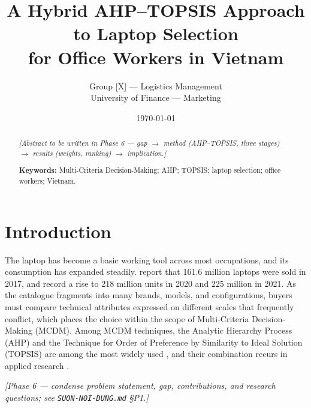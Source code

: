\documentclass[11pt,a4paper]{article}
\title{A Hybrid AHP--TOPSIS Approach to Laptop Selection\\for Office Workers in Vietnam}
\author{Group [X] --- Logistics Management\\University of Finance --- Marketing}
\date{\today}
\begin{document}
\maketitle

\begin{abstract}
\noindent\textit{[Abstract to be written in Phase 6 --- gap $\rightarrow$ method (AHP--TOPSIS, three stages) $\rightarrow$ results (weights, ranking) $\rightarrow$ implication.]}

\vspace{0.5em}
\noindent\textbf{Keywords:} Multi-Criteria Decision-Making; AHP; TOPSIS; laptop selection; office workers; Vietnam.
\end{abstract}

\section{Introduction}\label{sec:p-intro}

The laptop has become a basic working tool across most occupations, and its consumption has
expanded steadily. \textcite{sonmez_cakir_determination_2020} report that 161.6 million laptops
were sold in 2017, and \textcite{gaur_application_2023} record a rise to 218 million units in
2020 and 225 million in 2021. As the catalogue fragments into many brands, models, and
configurations, buyers must compare technical attributes expressed on different scales that
frequently conflict, which places the choice within the scope of Multi-Criteria Decision-Making
(MCDM). Among MCDM techniques, the Analytic Hierarchy Process (AHP) and the Technique for Order
of Preference by Similarity to Ideal Solution (TOPSIS) are among the most widely used
\parencite{basilio_systematic_2022,zyoud_bibliometric-based_2017}, and their combination recurs
in applied research \parencite{tighnavard_balasbaneh_systematic_2025}.

\textit{[Phase 6 — condense problem statement, gap, contributions, and research questions; see \texttt{SUON-NOI-DUNG.md} \S P1.]}

\end{document}
